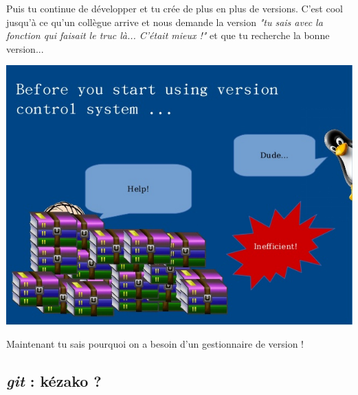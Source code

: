 \documentclass[12pt,a4paper]{article}
\begin{document}
Puis tu continue de développer et tu crée de plus en plus de versions. C'est cool jusqu'à ce qu'un collègue arrive et nous demande la version \emph{"tu sais avec la fonction qui faisait le truc là... C'était mieux !"} et que tu recherche la bonne version...

\begin{center}
\includegraphics[width=.75\linewidth]{before_lost}
\end{center}

Maintenant tu sais pourquoi on a besoin d'un gestionnaire de version !

\subsection{\emph{git} : kézako ?}
\end{document}
